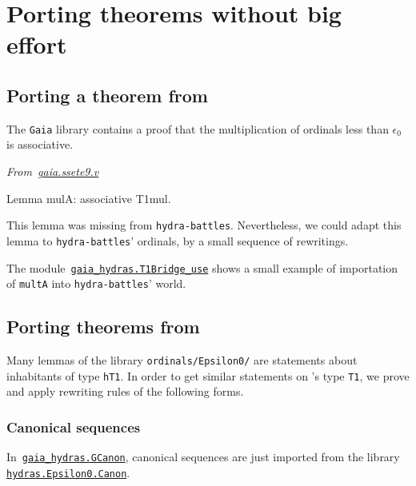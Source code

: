 

\section{Porting theorems without big effort}


\subsection{Porting a theorem from \gaia}
The \texttt{Gaia} library contains a proof that the multiplication of ordinals less than $\epsilon_0$ is associative.

\emph{From~\href{https://github.com/coq-community/gaia/blob/master/theories/ssete9.v}{gaia.ssete9.v}}

\begin{Coqsrc}
Lemma mulA: associative T1mul.
\end{Coqsrc}

This lemma was missing from \texttt{hydra-battles}. Nevertheless, we could adapt this lemma to \texttt{hydra-battles}' ordinals, by a small sequence of rewritings.


The module~\href{../theories/html/gaia_hydras.T1Bridge_use.html}%
{\texttt{gaia\_hydras.T1Bridge\_use}} shows a small
example of importation of \texttt{multA} into \texttt{hydra-battles}' world.


\subsection{Porting theorems from \Hydras}


Many lemmas of the library \texttt{ordinals/Epsilon0/} are statements about inhabitants of type \texttt{hT1}. In order to get
similar statements on \gaia's type \texttt{T1}, we prove and
apply rewriting rules of the following forms.



\subsubsection{Canonical sequences}


In~\href{../theories/html/gaia_hydras.GCanon.html}%
{\texttt{gaia\_hydras.GCanon}}, canonical sequences are just imported from the library \linebreak
\href{../theories/html/hydras.Epsilon0.Canon.html}%
{\texttt{hydras.Epsilon0.Canon}}.

